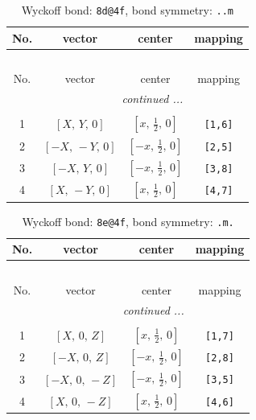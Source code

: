 \documentclass[fleqn,8pt]{jsarticle}
\begin{document}
\begin{longtable}{cccc}
\caption{Wyckoff bond: {\tt 8d@4f}, bond symmetry: {\tt ..m}}
 \\
 \hline \hline
No. & vector & center & mapping \\ \hline \endfirsthead

\multicolumn{3}{l}{\tablename\ \thetable{}} \\
 \hline \hline
No. & vector & center & mapping \\ \hline \endhead

 \hline \hline
\multicolumn{3}{r}{\footnotesize\it continued ...} \\ \endfoot

 \hline \hline
\multicolumn{3}{r}{} \\ \endlastfoot

1 & $\left[ X,\, Y,\, 0 \right]$ & $\left[ x,\, \frac{1}{2},\, 0 \right]$ & {\tt [1,6]} \\ \hline
2 & $\left[ - X,\, - Y,\, 0 \right]$ & $\left[ - x,\, \frac{1}{2},\, 0 \right]$ & {\tt [2,5]} \\ \hline
3 & $\left[ - X,\, Y,\, 0 \right]$ & $\left[ - x,\, \frac{1}{2},\, 0 \right]$ & {\tt [3,8]} \\ \hline
4 & $\left[ X,\, - Y,\, 0 \right]$ & $\left[ x,\, \frac{1}{2},\, 0 \right]$ & {\tt [4,7]} \\
\end{longtable}
\renewcommand{\arraystretch}{1.2}
\begin{longtable}{cccc}
\caption{Wyckoff bond: {\tt 8e@4f}, bond symmetry: {\tt .m.}}
 \\
 \hline \hline
No. & vector & center & mapping \\ \hline \endfirsthead

\multicolumn{3}{l}{\tablename\ \thetable{}} \\
 \hline \hline
No. & vector & center & mapping \\ \hline \endhead

 \hline \hline
\multicolumn{3}{r}{\footnotesize\it continued ...} \\ \endfoot

 \hline \hline
\multicolumn{3}{r}{} \\ \endlastfoot

1 & $\left[ X,\, 0,\, Z \right]$ & $\left[ x,\, \frac{1}{2},\, 0 \right]$ & {\tt [1,7]} \\ \hline
2 & $\left[ - X,\, 0,\, Z \right]$ & $\left[ - x,\, \frac{1}{2},\, 0 \right]$ & {\tt [2,8]} \\ \hline
3 & $\left[ - X,\, 0,\, - Z \right]$ & $\left[ - x,\, \frac{1}{2},\, 0 \right]$ & {\tt [3,5]} \\ \hline
4 & $\left[ X,\, 0,\, - Z \right]$ & $\left[ x,\, \frac{1}{2},\, 0 \right]$ & {\tt [4,6]} \\
\end{longtable}
\end{document}
